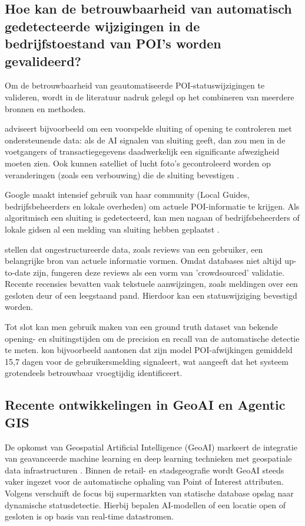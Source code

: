 \subsection{Hoe kan de betrouwbaarheid van automatisch gedetecteerde wijzigingen in de bedrijfstoestand van POI’s worden gevalideerd?}
\label{sec:validatie}
Om de betrouwbaarheid van geautomatiseerde POI-statuswijzigingen te valideren, wordt in de literatuur nadruk gelegd op het combineren van meerdere bronnen en methoden. 

\textcite{Taylor2022} adviseert bijvoorbeeld om een voorspelde sluiting of opening te controleren met ondersteunende data: als de AI signalen van sluiting geeft, dan zou men in de voetgangers of transactiegegevens daadwerkelijk een significante afwezigheid moeten zien. Ook kunnen satelliet of lucht foto’s gecontroleerd worden op veranderingen (zoals een verbouwing) die de sluiting bevestigen \autocite{Taylor2022}.

Google maakt intensief gebruik van haar community (Local Guides, bedrijfsbeheerders en lokale overheden) om actuele POI-informatie te krijgen. Als algoritmisch een sluiting is gedetecteerd, kan men nagaan of bedrijfsbeheerders of lokale gidsen al een melding van sluiting hebben geplaatst \autocite{Pericolosi2022}.

\textcite{Mauro2022} stellen dat ongestructureerde data, zoals reviews van een gebruiker, een belangrijke bron van actuele informatie vormen. Omdat databases niet altijd up-to-date zijn, fungeren deze reviews als een vorm van 'crowdsourced' validatie. Recente recensies bevatten vaak tekstuele aanwijzingen, zoals meldingen over een gesloten deur of een leegstaand pand. Hierdoor kan een statuswijziging bevestigd worden.

Tot slot kan men gebruik maken van een ground truth dataset van bekende opening- en sluitingstijden om de precision en recall van de automatische detectie te meten. \textcite{Yao2024} kon bijvoorbeeld aantonen dat zijn model POI-afwijkingen gemiddeld 15,7 dagen voor de gebruikersmelding signaleert, wat aangeeft dat het systeem grotendeels betrouwbaar vroegtijdig identificeert.

\subsection{Recente ontwikkelingen in GeoAI en Agentic GIS}
\label{sec:geoai}

De opkomst van Geospatial Artificial Intelligence (GeoAI) markeert de integratie van geavanceerde machine learning en deep learning technieken met geospatiale data infrastructuren \autocite{Boutayeb2024}. Binnen de retail- en stadsgeografie wordt GeoAI steeds vaker ingezet voor de automatische ophaling van Point of Interest attributen. Volgens \textcite{Mai2025} verschuift de focus bij supermarkten van statische database opslag naar dynamische statusdetectie. Hierbij bepalen AI-modellen of een locatie open of gesloten is op basis van real-time datastromen.

